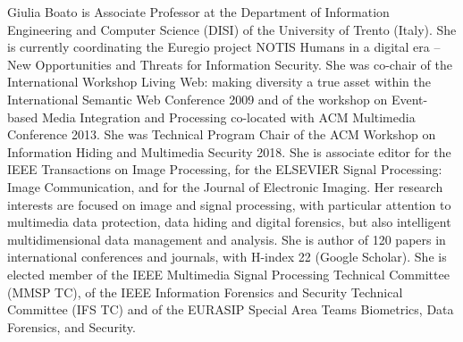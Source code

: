\documentclass{ieeeaccess}
\begin{document}
\begin{IEEEbiography}{Giulia Boato} is Associate Professor at the Department of Information Engineering and Computer Science (DISI) of the University of Trento (Italy). She is currently coordinating the Euregio project NOTIS Humans in a digital era – New Opportunities and Threats for Information Security.  She was co-chair of the International Workshop Living Web: making diversity a true asset within the International Semantic Web Conference 2009 and of the workshop on Event-based Media Integration and Processing co-located with ACM Multimedia Conference 2013. She was Technical Program Chair of the ACM Workshop on Information Hiding and Multimedia Security 2018. She is associate editor for the IEEE Transactions on Image Processing, for the ELSEVIER Signal Processing: Image Communication, and for the Journal of Electronic Imaging. Her research interests are focused on image and signal processing, with particular attention to multimedia data protection, data hiding and digital forensics, but also intelligent multidimensional data management and analysis. She is author of 120 papers in international conferences and journals, with H-index 22 (Google Scholar). She is elected member of the IEEE Multimedia Signal Processing Technical Committee (MMSP TC), of the IEEE Information Forensics and Security Technical Committee (IFS TC) and of the EURASIP Special Area Teams Biometrics, Data Forensics, and Security.
\end{IEEEbiography}
\end{document}
